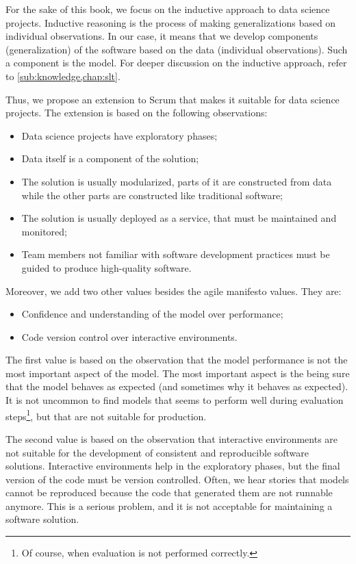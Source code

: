 For the sake of this book, we focus on the inductive approach to data science projects.
Inductive reasoning is the process of making generalizations based on individual
observations.  In our case, it means that we develop components (generalization) of the
software based on the data (individual observations).  Such a component is the
\gls{model}. For deeper discussion on the inductive approach, refer to
\cref{sub:knowledge,chap:slt}.

Thus, we propose an extension to Scrum that makes it suitable for data science projects.
The extension is based on the following observations:
\begin{itemize}
  \itemsep0em
  \item Data science projects have exploratory phases;
  \item Data itself is a component of the solution;
  \item The solution is usually modularized, parts of it are constructed from data while the
    other parts are constructed like traditional software;
  \item The solution is usually deployed as a service, that must be maintained and
    monitored;
  \item Team members not familiar with software development practices must be guided to
    produce high-quality software.
\end{itemize}

Moreover, we add two other values besides the agile manifesto values.  They are:
\begin{itemize}
  \itemsep0em
  \item Confidence and understanding of the model over performance;
  \item Code version control over interactive environments.
\end{itemize}

The first value is based on the observation that the model performance is not the most
important aspect of the model.  The most important aspect is the being sure that the model
behaves as expected (and sometimes why it behaves as expected).  It is not uncommon to find
models that seems to perform well during evaluation steps\footnote{Of course, when
evaluation is not performed correctly.}, but that are not suitable for production.

The second value is based on the observation that interactive environments are not suitable
for the development of consistent and reproducible software solutions.  Interactive environments
help in the exploratory phases, but the final version of the code must be version
controlled.  Often, we hear stories that models cannot be reproduced because the code that
generated them are not runnable anymore.  This is a serious problem, and it is not
acceptable for maintaining a software solution.

